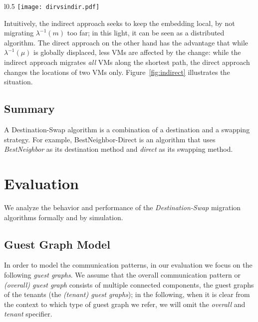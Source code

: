 \documentclass[conference]{IEEEtran}
\newcommand{\BestNeighborD}{{\sc BestNeighbor-Direct} }
\begin{document}
\begin{wrapfigure}{l}{0.5\columnwidth}
	\centering
\centering
				\centering
				\texttt{[image: dirvsindir.pdf]}\\
				\caption{Direct vs Indirect Swapping}
				\label{fig:indirect}
\end{wrapfigure}
Intuitively, the indirect approach seeks to keep the embedding local, by not migrating $\lambda^{-1}(m)$ too far; in this light,
it can be seen as a distributed algorithm. The direct approach
on the other hand has the advantage that while $\lambda^{-1}(\mu)$ is globally displaced, less VMs are affected by the change:
while the indirect approach migrates \emph{all} VMs along the shortest path, the direct approach changes the locations of two VMs only.
Figure~\ref{fig:indirect} illustrates the situation.





\subsection{Summary}

A Destination-Swap algorithm is a combination of a destination and a swapping strategy. For example, \BestNeighborD is an algorithm that uses \emph{BestNeighbor} as its destination method and \emph{direct} as its swapping method.


\section{Evaluation}\label{sec:simulations}

We analyze the behavior and performance of the \emph{Destination-Swap} migration algorithms formally and
by simulation.

\subsection{Guest Graph Model}

In order to model the communication patterns, in our evaluation we focus on the following \emph{guest graphs}.
We assume that the overall communication pattern or \emph{(overall) guest graph} consists of multiple connected components, the guest graphs of the tenants
(the \emph{(tenant) guest graphs}); in the following, when it is clear from the context to which type of guest graph we refer, we will omit the \emph{overall} and \emph{tenant}
specifier.
\end{document}
